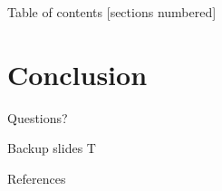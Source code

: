 \documentclass[11pt]{beamer}
\begin{document}


\begin{frame}{Table of contents}
  [sections numbered]
  \tableofcontents%
\end{frame}



\section{Conclusion}

{
\begin{frame}
  Questions?
\end{frame}
}

\appendix

\begin{frame}[fragile]{Backup slides}
T
\end{frame}

\begin{frame}[allowframebreaks]{References}
  
  
\end{frame}
\end{document}
